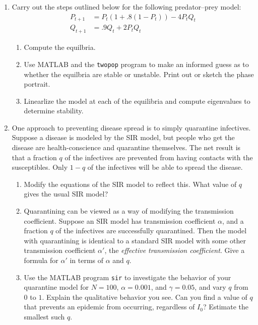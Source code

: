 \documentclass[12pt]{article}
\begin{document}
$\;$

\begin{enumerate}


\item Carry out the steps outlined below for the following
  predator--prey model:
  \begin{align*}
    P_{t+1}&=P_t(1+.8(1-P_t))-4P_tQ_t \\
    Q_{t+1}&=.9Q_t+2P_tQ_t
  \end{align*}
  \begin{enumerate}
  \item Compute the equilbria.
  \item Use MATLAB and the {\tt twopop} program to make an informed
    guess as to whether the equilbria are stable or unstable. Print
    out or sketch the phase portrait.
  \item Linearlize the model at each of the equilibria and compute
    eigenvalues to determine stability.
  \end{enumerate}



\item One approach to preventing disease spread is to simply
  quarantine infectives. Suppose a disease is modeled by the SIR
  model, but people who get the disease are health-conscience and
  quarantine themselves. The net result is that a fraction $q$ of the
  infectives are prevented from having contacts with the
  susceptibles. Only $1-q$ of the infectives will be able to spread
  the disease.
  \begin{enumerate}
    \item Modify the equations of the SIR model to reflect this. What
      value of $q$ gives the usual SIR model?
    \item Quarantining can be viewed as a way of modifying the
      transmission coefficient. Suppose an SIR model has transmission
      coefficient $\alpha$, and a fraction $q$ of the infectives are
      successfully quarantined. Then the model with quarantining is
      identical to a standard SIR model with some other transmission
      coefficient $\alpha'$, the \emph{effective transmission
        coefficient}. Give a formula for $\alpha'$ in terms of
      $\alpha$ and $q$.
    \item Use the MATLAB program {\tt sir} to investigate the behavior
      of your quarantine model for $N=100$, $\alpha=0.001$, and
      $\gamma=0.05$, and vary $q$ from $0$ to $1$. Explain the
      qualitative behavior you see. Can you find a value of $q$ that
      prevents an epidemic from occurring, regardless of $I_0$?
      Estimate the smallest such $q$.
  \end{enumerate}




\end{enumerate}
\end{document}
